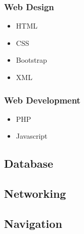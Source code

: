 \documentclass{article}
\begin{document}
		\subsubsection{Web Design}
			\begin{itemize}
				\item HTML
				\item CSS
				\item Bootstrap
				\item XML
			\end{itemize}
		\subsubsection{Web Development}
			\begin{itemize}
				\item PHP
				\item Javascript
			\end{itemize}
	\subsection{Database}
		\begin{itemize}
		\end{itemize}
	\subsection{Networking}	
		\begin{itemize}
		\end{itemize}
	\subsection{Navigation}
		\begin{itemize}
		\end{itemize}
\end{document}
